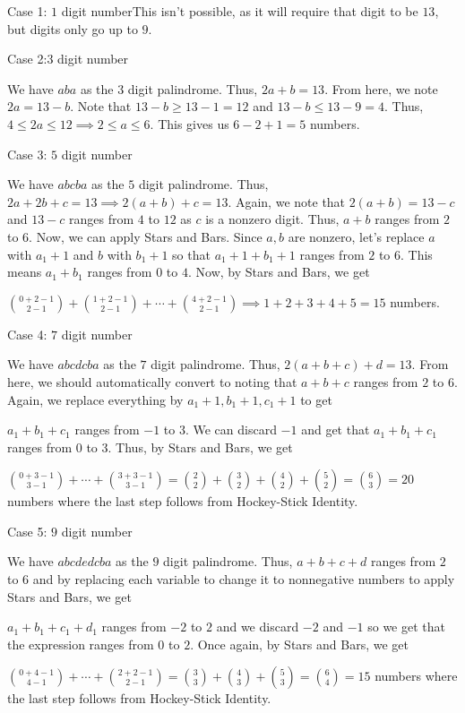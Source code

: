 \begin{enumerate}
 Case 1: $1$ digit numberThis isn't possible, as it will require that digit to be $13$, but digits only go up to $9$. 

 Case 2:$3$ digit number

 We have $aba$ as the $3$ digit palindrome. Thus, $2a + b = 13$. From here, we note $2a = 13 - b$. Note that $13 - b \geq 13 - 1 = 12$ and $13 - b \leq 13 - 9 = 4$. Thus, $4 \leq 2a \leq 12 \implies 2 \leq a \leq 6$. This gives us $6 - 2 + 1 = 5$ numbers.

 Case 3: $5$ digit number

 We have $abcba$ as the $5$ digit palindrome. Thus, $2a + 2b + c = 13 \implies 2(a + b) + c = 13$. Again, we note that $2(a + b) = 13 - c$ and $13 - c$ ranges from $4$ to $12$ as $c$ is a nonzero digit. Thus, $a + b$ ranges from $2$ to $6$. Now, we can apply Stars and Bars. Since $a, b$ are nonzero, let's replace $a$ with $a_1 + 1$ and $b$ with $b_1 + 1$ so that $a_1 + 1 + b_1 + 1$ ranges from $2$ to $6$. This means $a_1 + b_1$ ranges from $0$ to $4$. Now, by Stars and Bars, we get

 $\binom{0 + 2 - 1}{2 - 1} + \binom{1 + 2 - 1}{2 - 1} + \cdots + \binom{4 + 2 - 1}{2 - 1} \implies 1 + 2 + 3 + 4 + 5 = 15$ numbers.

 Case 4: $7$ digit number

 We have $abcdcba$ as the $7$ digit palindrome. Thus, $2(a + b + c) + d = 13$. From here, we should automatically convert to noting that $a + b + c$ ranges from $2$ to $6$. Again, we replace everything by $a_1 + 1, b_1 + 1, c_1 + 1$ to get

 $a_1 + b_1 + c_1$ ranges from $-1$ to $3$. We can discard $-1$ and get that $a_1 + b_1 + c_1$ ranges from $0$ to $3$. Thus, by Stars and Bars, we get

 $\binom{0 + 3 - 1}{3 - 1} + \cdots + \binom{3 + 3 - 1}{3 - 1} = \binom{2}{2} + \binom{3}{2} + \binom{4}{2} + \binom{5}{2} = \binom{6}{3} = 20$ numbers where the last step follows from Hockey-Stick Identity. 

 Case 5: $9$ digit number

 We have $abcdedcba$ as the $9$ digit palindrome. Thus, $a + b + c + d$ ranges from $2$ to $6$ and by replacing each variable to change it to nonnegative numbers to apply Stars and Bars, we get

 $a_1 + b_1 + c_1 + d_1$ ranges from $-2$ to $2$ and we discard $-2$ and $-1$ so we get that the expression ranges from $0$ to $2$. Once again, by Stars and Bars, we get

 $\binom{0 + 4 - 1}{4 - 1} + \cdots + \binom{2 + 2 - 1}{2 - 1} = \binom{3}{3} + \binom{4}{3} + \binom{5}{3} = \binom{6}{4} = 15$ numbers where the last step follows from Hockey-Stick Identity.


\end{enumerate}
